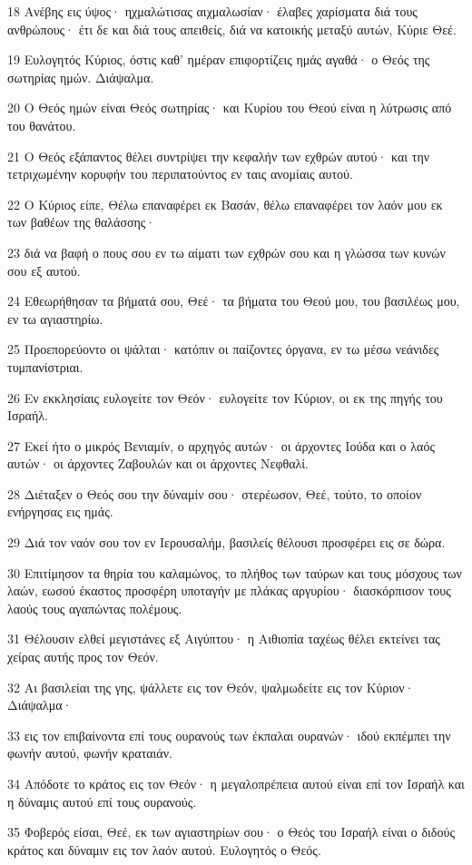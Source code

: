 \par 18 Ανέβης εις ύψος· ηχμαλώτισας αιχμαλωσίαν· έλαβες χαρίσματα διά τους ανθρώπους· έτι δε και διά τους απειθείς, διά να κατοικής μεταξύ αυτών, Κύριε Θεέ.
\par 19 Ευλογητός Κύριος, όστις καθ' ημέραν επιφορτίζεις ημάς αγαθά· ο Θεός της σωτηρίας ημών. Διάψαλμα.
\par 20 Ο Θεός ημών είναι Θεός σωτηρίας· και Κυρίου του Θεού είναι η λύτρωσις από του θανάτου.
\par 21 Ο Θεός εξάπαντος θέλει συντρίψει την κεφαλήν των εχθρών αυτού· και την τετριχωμένην κορυφήν του περιπατούντος εν ταις ανομίαις αυτού.
\par 22 Ο Κύριος είπε, Θέλω επαναφέρει εκ Βασάν, θέλω επαναφέρει τον λαόν μου εκ των βαθέων της θαλάσσης·
\par 23 διά να βαφή ο πους σου εν τω αίματι των εχθρών σου και η γλώσσα των κυνών σου εξ αυτού.
\par 24 Εθεωρήθησαν τα βήματά σου, Θεέ· τα βήματα του Θεού μου, του βασιλέως μου, εν τω αγιαστηρίω.
\par 25 Προεπορεύοντο οι ψάλται· κατόπιν οι παίζοντες όργανα, εν τω μέσω νεάνιδες τυμπανίστριαι.
\par 26 Εν εκκλησίαις ευλογείτε τον Θεόν· ευλογείτε τον Κύριον, οι εκ της πηγής του Ισραήλ.
\par 27 Εκεί ήτο ο μικρός Βενιαμίν, ο αρχηγός αυτών· οι άρχοντες Ιούδα και ο λαός αυτών· οι άρχοντες Ζαβουλών και οι άρχοντες Νεφθαλί.
\par 28 Διέταξεν ο Θεός σου την δύναμίν σου· στερέωσον, Θεέ, τούτο, το οποίον ενήργησας εις ημάς.
\par 29 Διά τον ναόν σου τον εν Ιερουσαλήμ, βασιλείς θέλουσι προσφέρει εις σε δώρα.
\par 30 Επιτίμησον τα θηρία του καλαμώνος, το πλήθος των ταύρων και τους μόσχους των λαών, εωσού έκαστος προσφέρη υποταγήν με πλάκας αργυρίου· διασκόρπισον τους λαούς τους αγαπώντας πολέμους.
\par 31 Θέλουσιν ελθεί μεγιστάνες εξ Αιγύπτου· η Αιθιοπία ταχέως θέλει εκτείνει τας χείρας αυτής προς τον Θεόν.
\par 32 Αι βασιλείαι της γης, ψάλλετε εις τον Θεόν, ψαλμωδείτε εις τον Κύριον· Διάψαλμα·
\par 33 εις τον επιβαίνοντα επί τους ουρανούς των έκπαλαι ουρανών· ιδού εκπέμπει την φωνήν αυτού, φωνήν κραταιάν.
\par 34 Απόδοτε το κράτος εις τον Θεόν· η μεγαλοπρέπεια αυτού είναι επί τον Ισραήλ και η δύναμις αυτού επί τους ουρανούς.
\par 35 Φοβερός είσαι, Θεέ, εκ των αγιαστηρίων σου· ο Θεός του Ισραήλ είναι ο διδούς κράτος και δύναμιν εις τον λαόν αυτού. Ευλογητός ο Θεός.

